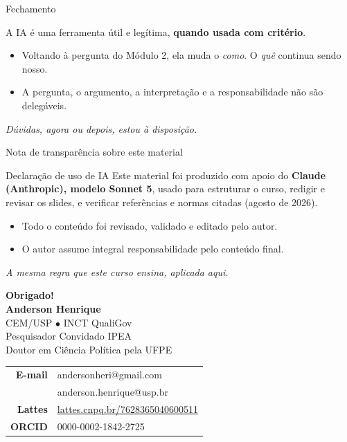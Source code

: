 \documentclass[11pt,aspectratio=169,t]{beamer}
\begin{document}
\begin{frame}{Fechamento}
  \begin{block}{}
    \centering\large
    A IA é uma ferramenta útil e legítima, \textbf{quando usada com critério}.
  \end{block}
  \vfill
  \begin{itemize}
    \item Voltando à pergunta do Módulo 2, ela muda o \textit{como}. O \textit{quê} continua sendo nosso.
    \item A pergunta, o argumento, a interpretação e a responsabilidade não são delegáveis.
  \end{itemize}
  \vfill
  \centering\small\textit{Dúvidas, agora ou depois, estou à disposição.}
\end{frame}

\begin{frame}{Nota de transparência sobre este material}
  \begin{block}{Declaração de uso de IA}
    \small Este material foi produzido com apoio do \textbf{Claude (Anthropic), modelo Sonnet 5}, usado para estruturar o curso, redigir e revisar os slides, e verificar referências e normas citadas (agosto de 2026).
  \end{block}
  \pause
  \vfill
  \begin{itemize}
    \item Todo o conteúdo foi revisado, validado e editado pelo autor.
    \item O autor assume integral responsabilidade pelo conteúdo final.
  \end{itemize}
  \pause
  \vfill
  \centering\small\textit{A mesma regra que este curso ensina, aplicada aqui.}
\end{frame}

\begin{frame}[plain]
  \centering
  \vspace*{1cm}
  {\Huge\color{azulUNI}\textbf{Obrigado!}}\\[1.2cm]
  {\Large\textbf{Anderson Henrique}}\\[0.4cm]
  \small CEM/USP $\bullet$ INCT QualiGov\\
  \small Pesquisador Convidado IPEA\\
  \small Doutor em Ciência Política pela UFPE\\[1cm]
  \normalsize
  \begin{tabular}{rl}
    \textbf{E-mail} & andersonheri@gmail.com \\
                     & anderson.henrique@usp.br \\
    \textbf{Lattes} & \href{http://lattes.cnpq.br/7628365040600511}{lattes.cnpq.br/7628365040600511} \\
    \textbf{ORCID}  & 0000-0002-1842-2725 \\
  \end{tabular}
\end{frame}
\end{document}
